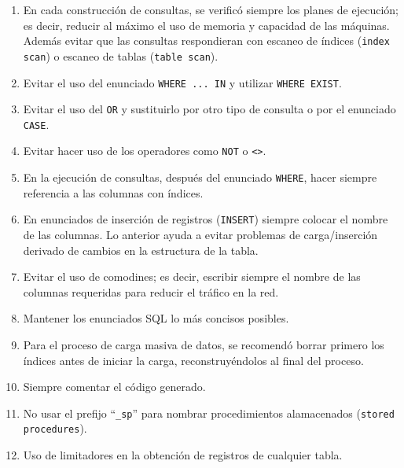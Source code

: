 \begin{enumerate}

\item En cada construcción de consultas, se verificó siempre los planes de
  ejecución; es decir, reducir al máximo el uso de memoria y capacidad de las
  máquinas. Además evitar que las consultas respondieran con escaneo de índices
  (\texttt{index scan}) o escaneo de tablas (\texttt{table scan}).

\item Evitar el uso del enunciado \texttt{WHERE ... IN} y utilizar \texttt{WHERE
    EXIST}.

\item Evitar el uso del \texttt{OR} y sustituirlo por otro tipo de consulta o
  por el enunciado \texttt{CASE}.

\item Evitar hacer uso de los operadores como \texttt{NOT} o
  \texttt{\textless\textgreater}.

\item En la ejecución de consultas, después del enunciado \texttt{WHERE}, hacer
  siempre referencia a las columnas con índices.

\item En enunciados de inserción de registros (\texttt{INSERT}) siempre colocar
  el nombre de las columnas. Lo anterior ayuda a evitar problemas de
  carga/inserción derivado de cambios en la estructura de la tabla.

\item Evitar el uso de comodines; es decir, escribir siempre el nombre de las
  columnas requeridas para reducir el tráfico en la red.

\item Mantener los enunciados SQL lo más concisos posibles.

\item Para el proceso de carga masiva de datos, se recomendó borrar primero los
  índices antes de iniciar la carga, reconstruyéndolos al final del proceso.

\item Siempre comentar el código generado.

\item No usar el prefijo ``\texttt{\_sp}'' para nombrar procedimientos
  alamacenados (\texttt{stored procedures}).

\item Uso de limitadores en la obtención de registros de cualquier tabla.


\end{enumerate}
